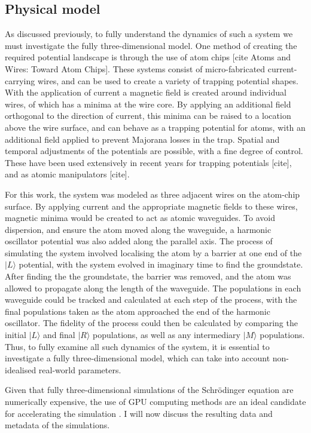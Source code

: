 \subsection{Physical model}

As discussed previously, to fully understand the dynamics of such a system we must investigate the fully three-dimensional model. One method of creating the required potential landscape is through the use of atom chips \cite{Bartenstein_ieee_2000}[cite Atoms and Wires: Toward Atom Chips]. These systems consist of micro-fabricated current-carrying wires, and can be used to create a variety of trapping potential shapes. With the application of current a magnetic field is created around individual wires, of which has a minima at the wire core. By applying an additional field orthogonal to the direction of current, this minima can be raised to a location above the wire surface, and can behave as a trapping potential for atoms, with an additional field applied to prevent Majorana losses in the trap. Spatial and temporal adjustments of the potentials are possible, with a fine degree of control. These have been used extensively in recent years for trapping potentials [cite], and as atomic manipulators [cite].

For this work, the system was modeled as three adjacent wires on the atom-chip surface. By applying current and the appropriate magnetic fields to these wires, magnetic minima would be created to act as atomic waveguides. To avoid dispersion, and ensure the atom moved along the waveguide, a harmonic oscillator potential was also added along the parallel axis. The process of simulating the system involved localising the atom by a barrier at one end of the $|L\rangle$ potential, with the system evolved in imaginary time to find the groundstate. After finding the the groundstate, the barrier was removed, and the atom was allowed to propagate along the length of the waveguide. The populations in each waveguide could be tracked and calculated at each step of the process, with the final populations taken as the atom approached the end of the harmonic oscillator. The fidelity of the process could then be calculated by comparing the initial $| L \rangle$ and final $|R \rangle$ populations, as well as any intermediary $| M \rangle$ populations. Thus, to fully examine all such dynamics of the system, it is essential to investigate a fully three-dimensional model, which can take into account non-idealised real-world parameters.

Given that fully three-dimensional simulations of the Schr\"odinger equation are numerically expensive, the use of GPU computing methods are an ideal candidate for accelerating the simulation \cite{Bauke:11}. I will now discuss the resulting data and metadata of the simulations.



